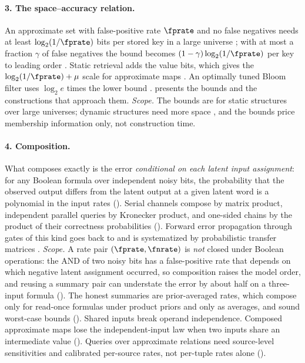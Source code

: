 \paragraph{3. The space--accuracy relation.}
An approximate set with false-positive rate $\fprate$ and no false negatives
needs at least $\log_2(1/\fprate)$ bits per stored key in a large universe
\parencite{carter-et-al-1978}; with at most a fraction $\gamma$ of false
negatives the bound becomes $(1 - \gamma)\log_2(1/\fprate)$ per key to leading
order \parencite{pagh-rodler-2001}. Static retrieval adds the value bits, which
gives the $\log_2(1/\fprate) + \mu$ scale for approximate maps
\parencite{dietzfelbinger-pagh-2008}. An optimally tuned Bloom filter uses
$\log_2 e$ times the lower bound \parencite{broder-mitzenmacher-2004}.
 presents the bounds and
 the constructions that
approach them. \emph{Scope.} The bounds are for static structures over large
universes; dynamic structures need more space \parencite{lovett-porat-2010}, and
the bounds price membership information only, not construction time.

\paragraph{4. Composition.}
What composes exactly is the error \emph{conditional on each latent input
assignment}: for any Boolean formula over independent noisy bits, the
probability that the observed output differs from the latent output at a given
latent word is a polynomial in the input rates
(). Serial channels compose by matrix product,
independent parallel queries by Kronecker product, and one-sided chains by the
product of their correctness probabilities (). Forward
error propagation through gates of this kind goes back to
\textcite{parker-mccluskey-1975} and is systematized by probabilistic transfer
matrices \parencite{krishnaswamy-et-al-2008}. \emph{Scope.} A rate pair
$(\fprate, \fnrate)$ is \emph{not} closed under Boolean operations: the AND of
two noisy bits has a false-positive rate that depends on which negative latent
assignment occurred, so composition raises the model order, and reusing a
summary pair can understate the error by about half on a three-input formula
(). The honest summaries are prior-averaged
rates, which compose only for read-once formulas under product priors and only
as averages, and sound worst-case bounds ().
Shared inputs break operand independence. Composed approximate maps lose the
independent-input law when two inputs share an intermediate value
(). Queries over approximate relations need
source-level sensitivities and calibrated per-source rates, not per-tuple rates
alone ().

